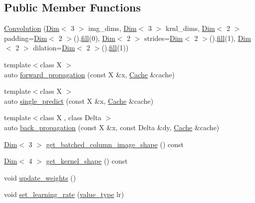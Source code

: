 \subsection*{Public Member Functions}
\begin{DoxyCompactItemize}
\item 
\hyperlink{structbc_1_1nn_1_1Convolution_a597f57342a57ee7a76e48e2d55f8ec00}{Convolution} (\hyperlink{structbc_1_1Dim}{Dim}$<$ 3 $>$ img\+\_\+dims, \hyperlink{structbc_1_1Dim}{Dim}$<$ 3 $>$ krnl\+\_\+dims, \hyperlink{structbc_1_1Dim}{Dim}$<$ 2 $>$ padding=\hyperlink{structbc_1_1Dim}{Dim}$<$ 2 $>$().\hyperlink{tensor__iteralgos_8h_afd10a40f252abd24d1faa2752becdd53}{fill}(0), \hyperlink{structbc_1_1Dim}{Dim}$<$ 2 $>$ strides=\hyperlink{structbc_1_1Dim}{Dim}$<$ 2 $>$().\hyperlink{tensor__iteralgos_8h_afd10a40f252abd24d1faa2752becdd53}{fill}(1), \hyperlink{structbc_1_1Dim}{Dim}$<$ 2 $>$ dilation=\hyperlink{structbc_1_1Dim}{Dim}$<$ 2 $>$().\hyperlink{tensor__iteralgos_8h_afd10a40f252abd24d1faa2752becdd53}{fill}(1))
\item 
{\footnotesize template$<$class X $>$ }\\auto \hyperlink{structbc_1_1nn_1_1Convolution_a99ff4923bc1f445a1497bfb11914930f}{forward\+\_\+propagation} (const X \&x, \hyperlink{structbc_1_1nn_1_1Cache}{Cache} \&cache)
\item 
{\footnotesize template$<$class X $>$ }\\auto \hyperlink{structbc_1_1nn_1_1Convolution_abad1b5837d3b22637c254d7dafecbb8c}{single\+\_\+predict} (const X \&x, \hyperlink{structbc_1_1nn_1_1Cache}{Cache} \&cache)
\item 
{\footnotesize template$<$class X , class Delta $>$ }\\auto \hyperlink{structbc_1_1nn_1_1Convolution_afc07b8db150a19ecd72ad285009f6232}{back\+\_\+propagation} (const X \&x, const Delta \&dy, \hyperlink{structbc_1_1nn_1_1Cache}{Cache} \&cache)
\item 
\hyperlink{structbc_1_1Dim}{Dim}$<$ 3 $>$ \hyperlink{structbc_1_1nn_1_1Convolution_a2ea23e12ab647c85966cb8f86f85e8bf}{get\+\_\+batched\+\_\+column\+\_\+image\+\_\+shape} () const
\item 
\hyperlink{structbc_1_1Dim}{Dim}$<$ 4 $>$ \hyperlink{structbc_1_1nn_1_1Convolution_a881a726a100f7494eb190f7b24295c18}{get\+\_\+kernel\+\_\+shape} () const
\item 
void \hyperlink{structbc_1_1nn_1_1Convolution_a867b470dc738fb6b533d7c0065a858b9}{update\+\_\+weights} ()
\item 
void \hyperlink{structbc_1_1nn_1_1Convolution_a023bbc5d98a0a005a092b07353bd608a}{set\+\_\+learning\+\_\+rate} (\hyperlink{structbc_1_1nn_1_1Convolution_ad57a7bb1413ba889d475bfafac3c8461}{value\+\_\+type} lr)

\end{DoxyCompactItemize}
